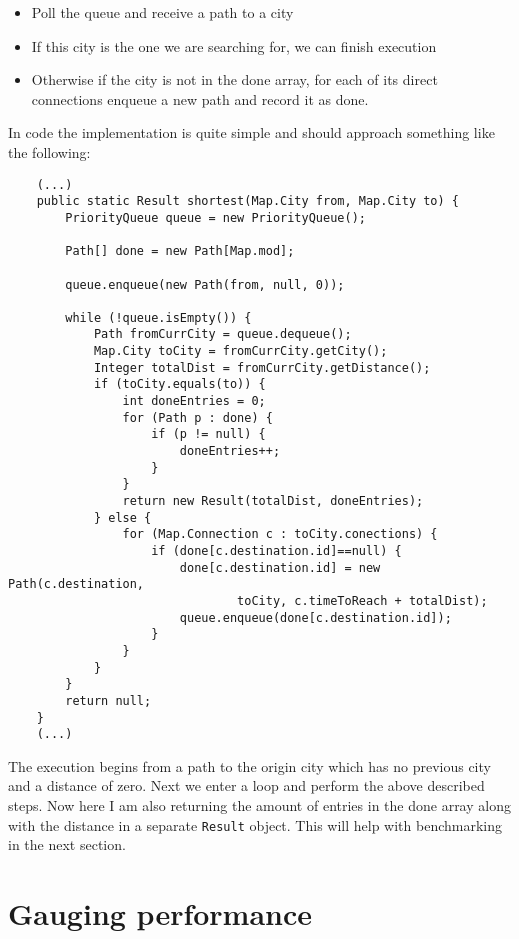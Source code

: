 \documentclass[a4paper,11pt]{article}
\begin{document}
\begin{itemize}
    \item Poll the queue and receive a path to a city
    \item If this city is the one we are searching for, we can finish execution
    \item Otherwise if the city is not in the done array, for each of its direct connections enqueue a new path and record it as done.
\end{itemize}

In code the implementation is quite simple and should approach something like the following:

\begin{verbatim}
    (...)
    public static Result shortest(Map.City from, Map.City to) {
        PriorityQueue queue = new PriorityQueue();

        Path[] done = new Path[Map.mod];
        
        queue.enqueue(new Path(from, null, 0));

        while (!queue.isEmpty()) {
            Path fromCurrCity = queue.dequeue();
            Map.City toCity = fromCurrCity.getCity();
            Integer totalDist = fromCurrCity.getDistance();
            if (toCity.equals(to)) {
                int doneEntries = 0;
                for (Path p : done) {
                    if (p != null) {
                        doneEntries++;
                    }
                }
                return new Result(totalDist, doneEntries);
            } else {
                for (Map.Connection c : toCity.conections) {
                    if (done[c.destination.id]==null) {
                        done[c.destination.id] = new Path(c.destination,
                                toCity, c.timeToReach + totalDist);
                        queue.enqueue(done[c.destination.id]);
                    }
                }
            }
        }
        return null;
    }
    (...)
\end{verbatim}

The execution begins from a path to the origin city which has no previous city and a distance of zero. Next we enter a loop and perform the above described steps. Now here I am also returning the amount of entries in the done array along with the distance in a separate {\tt Result} object. This will help with benchmarking in the next section.

\section*{Gauging performance}
\end{document}
